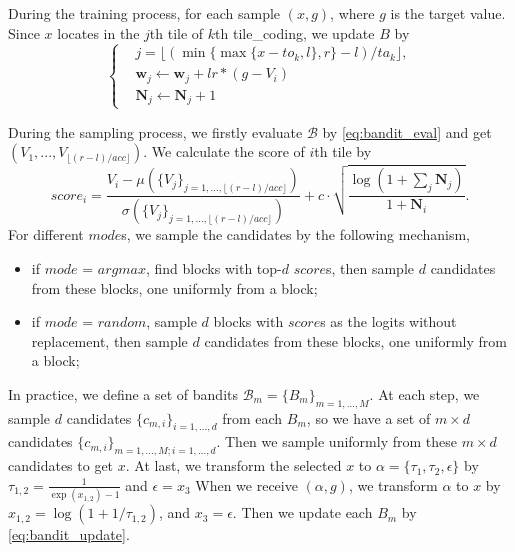\documentclass[nohyperref]{article}
\theoremstyle{plain}
\begin{document}
During the training process, for each sample $(x, g)$, where $g$ is the target value. Since $x$ locates in the $j$th tile of $k$th tile\_coding, we update $B$ by
\begin{equation}
\label{eq:bandit_update}
\left\{
\begin{aligned}
&j = \lfloor (\min\{\max\{x-to_{k}, l\}, r\} - l) / ta_{k} \rfloor, \\
&\textbf{w}_j 
\leftarrow \textbf{w}_j + lr * \left(g - V_i\right)\\
& \textbf{N}_j \leftarrow \textbf{N}_j + 1
\end{aligned}
\right.
\end{equation}

During the sampling process, we firstly evaluate $\mathcal{B}$ by \eqref{eq:bandit_eval} and get $(V_1, ..., V_{\lfloor (r-l) / acc \rfloor})$.
We calculate the score of $i$th tile by
\begin{equation}
\label{eq:bandit_score}
score_i = \frac{V_i - \mu(\{V_j\}_{j=1,...,\lfloor(r-l)/acc\rfloor})}{\sigma(\{V_j\}_{j=1,...,\lfloor(r-l)/acc\rfloor})} + c \cdot \sqrt{\frac{\log (1 + \sum_j \textbf{N}_j)}{1 + \textbf{N}_i}}.
\end{equation}
For different $mode$s, we sample the candidates by the following mechanism,
\begin{itemize}
    \item if $mode$ = $argmax$, find blocks with top-$d$ $score$s, then sample $d$ candidates from these blocks, one uniformly from a block;
    \item if $mode$ = $random$, sample $d$ blocks with $score$s as the logits without replacement, then sample $d$ candidates from these blocks, one uniformly from a block;
\end{itemize}

In practice, we define a set of bandits $\mathcal{B}_m = \{B_m\}_{m=1,...,M}$.
At each step, we sample $d$ candidates $\{c_{m, i}\}_{i=1,...,d}$ from each $B_m$, so we have a set of $m \times d$ candidates $\{c_{m, i}\}_{m=1,...,M; i=1,...,d}$.
Then we sample uniformly from these $m \times d$ candidates to get $x$. 
At last, we transform the selected $x$ to $\alpha=\{\tau_1,\tau_2,\epsilon\}$ by $\tau_{1,2} = \frac{1}{\exp (x_{1,2}) - 1}$ and $\epsilon = x_{3}$
When we receive $(\alpha, g)$, we transform $\alpha$ to $x$ by $x_{1,2} = \log (1 + 1 / \tau_{1,2})$, and  $x_{3} = \epsilon$.
Then we update each $B_m$ by \eqref{eq:bandit_update}.
\end{document}
